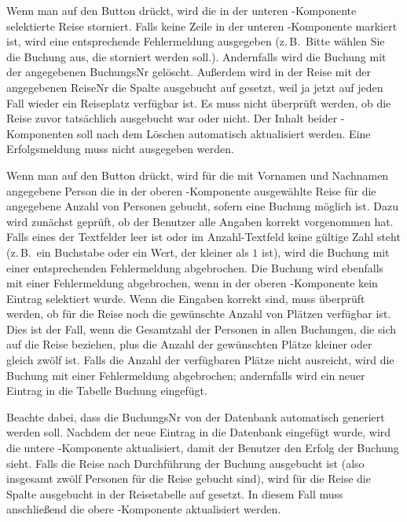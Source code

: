 \begin{compactenum}[a)]
Wenn man auf den Button  drückt, wird die in
der unteren -Komponente selektierte Reise storniert. Falls keine Zeile in
der unteren -Komponente markiert ist, wird eine entsprechende
Fehlermeldung ausgegeben (z.\,B.\ \glqq Bitte wählen Sie die Buchung aus, die storniert
werden soll.\grqq ). Andernfalls wird die Buchung mit der angegebenen BuchungsNr gelöscht.
Außerdem wird in der Reise mit der angegebenen ReiseNr die Spalte ausgebucht
auf  gesetzt, weil ja jetzt auf jeden Fall wieder ein
Reiseplatz verfügbar ist. Es muss nicht überprüft werden, ob die Reise zuvor
tatsächlich ausgebucht war oder nicht. Der Inhalt beider -Komponenten soll
nach dem Löschen automatisch aktualisiert werden. Eine Erfolgsmeldung muss
nicht ausgegeben werden.

Wenn man auf den Button  drückt, wird für die mit
Vornamen und Nachnamen angegebene Person die in der oberen -Komponente
ausgewählte Reise für die angegebene Anzahl von Personen gebucht, sofern eine
Buchung möglich ist. Dazu wird zunächst geprüft, ob der Benutzer alle Angaben
korrekt vorgenommen hat. Falls eines der Textfelder leer ist oder im
Anzahl-Textfeld keine gültige Zahl steht (z.\,B.\ ein Buchstabe oder ein Wert, der
kleiner als $1$ ist), wird die Buchung mit einer entsprechenden Fehlermeldung
abgebrochen. Die Buchung wird ebenfalls mit einer Fehlermeldung abgebrochen,
wenn in der oberen -Komponente kein Eintrag selektiert wurde. Wenn die
Eingaben korrekt sind, muss überprüft werden, ob für die Reise noch die
gewünschte Anzahl von Plätzen verfügbar ist. Dies ist der Fall, wenn die
Gesamtzahl der Personen in allen Buchungen, die sich auf die Reise beziehen,
plus die Anzahl der gewünschten Plätze kleiner oder gleich zwölf ist. Falls die
Anzahl der verfügbaren Plätze nicht ausreicht, wird die Buchung mit einer
Fehlermeldung abgebrochen; andernfalls wird ein neuer Eintrag in die Tabelle
Buchung eingefügt.

Beachte dabei, dass die BuchungsNr von der Datenbank automatisch generiert
werden soll. Nachdem der neue Eintrag in die Datenbank eingefügt wurde, wird
die untere -Komponente aktualisiert, damit der Benutzer den
Erfolg der Buchung sieht. Falls die Reise nach Durchführung der Buchung ausgebucht ist
(also insgesamt zwölf Personen für die Reise gebucht sind), wird für die Reise
die Spalte ausgebucht in der Reisetabelle auf  gesetzt. In diesem Fall muss
anschließend die obere -Komponente aktualisiert werden.
\end{compactenum}

